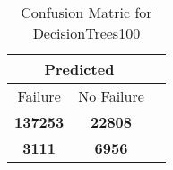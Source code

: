 \begin{table}[] 
\caption{Confusion Matric for DecisionTrees100} 
\label{Table: Prediction Accuracy-NoneDecisionTrees100RandomForest100EKF-ignoreReflection-Reflection} 
\centering 
\begin{tabular} 
 {@{}ccc@{}} 
\toprule 
\multicolumn{2}{c}{\textbf{Predicted}}
 \\ \midrule 
\multicolumn{1}{|c|}{Failure} & 
\multicolumn{1}{c|}{No Failure}
 \\ \midrule 
\multicolumn{1}{|c|}{\color{green}\textbf{137253}} & 
\multicolumn{1}{c|}{\color{green}\textbf{22808}}
 \\ \midrule 
\multicolumn{1}{|c|}{\color{red}\textbf{3111}} & 
\multicolumn{1}{c|}{\color{red}\textbf{6956}}
 \\ \bottomrule 
\end{tabular} 
\end{table} 

